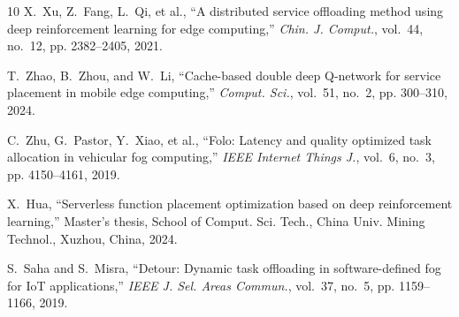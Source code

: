 \documentclass[lettersize,journal]{IEEEtran}
\begin{document}
\begin{thebibliography}{10}
X.~Xu, Z.~Fang, L.~Qi, et al., ``A distributed service offloading method using deep reinforcement learning for edge computing,'' \emph{Chin. J. Comput.}, vol.~44, no.~12, pp. 2382--2405, 2021.

T.~Zhao, B.~Zhou, and W.~Li, ``Cache-based double deep Q-network for service placement in mobile edge computing,'' \emph{Comput. Sci.}, vol.~51, no.~2, pp. 300--310, 2024.

C.~Zhu, G.~Pastor, Y.~Xiao, et al., ``Folo: Latency and quality optimized task allocation in vehicular fog computing,'' \emph{IEEE Internet Things J.}, vol.~6, no.~3, pp. 4150--4161, 2019.

X.~Hua, ``Serverless function placement optimization based on deep reinforcement learning,'' Master's thesis, School of Comput. Sci. Tech., China Univ. Mining Technol., Xuzhou, China, 2024.

S.~Saha and S.~Misra, ``Detour: Dynamic task offloading in software-defined fog for IoT applications,'' \emph{IEEE J. Sel. Areas Commun.}, vol.~37, no.~5, pp. 1159--1166, 2019.

\end{thebibliography}
\end{document}
